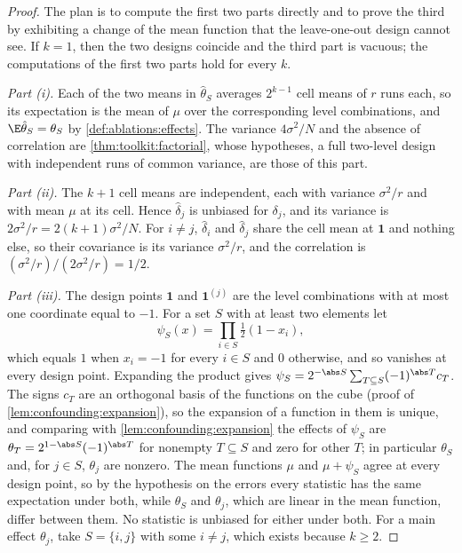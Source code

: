 \begin{refsection}
\begin{proof}
The plan is to compute the first two parts directly and to prove the third by exhibiting a change of the mean function that the leave-one-out design cannot see. If $k=1$, then the two designs coincide and the third part is vacuous; the computations of the first two parts hold for every $k$.

\emph{Part (i).} Each of the two means in $\hat\theta_S$ averages $2^{k-1}$ cell means of $r$ runs each, so its expectation is the mean of $\mu$ over the corresponding level combinations, and $\E\hat\theta_S=\theta_S$ by \cref{def:ablations:effects}. The variance $4\sigma^2/N$ and the absence of correlation are \cref{thm:toolkit:factorial}, whose hypotheses, a full two-level design with independent runs of common variance, are those of this part.

\emph{Part (ii).} The $k+1$ cell means are independent, each with variance $\sigma^2/r$ and with mean $\mu$ at its cell. Hence $\hat\delta_j$ is unbiased for $\delta_j$, and its variance is $2\sigma^2/r=2(k+1)\sigma^2/N$. For $i\ne j$, $\hat\delta_i$ and $\hat\delta_j$ share the cell mean at $\mathbf 1$ and nothing else, so their covariance is its variance $\sigma^2/r$, and the correlation is $(\sigma^2/r)/(2\sigma^2/r)=1/2$.

\emph{Part (iii).} The design points $\mathbf 1$ and $\mathbf 1^{(j)}$ are the level combinations with at most one coordinate equal to $-1$. For a set $S$ with at least two elements let
\[
\psi_S(x)=\prod_{i\in S}\tfrac12(1-x_i),
\]
which equals $1$ when $x_i=-1$ for every $i\in S$ and $0$ otherwise, and so vanishes at every design point. Expanding the product gives $\psi_S=2^{-\abs S}\sum_{T\subseteq S}(-1)^{\abs T}c_T$. The signs $c_T$ are an orthogonal basis of the functions on the cube (proof of \cref{lem:confounding:expansion}), so the expansion of a function in them is unique, and comparing with \cref{lem:confounding:expansion} the effects of $\psi_S$ are $\theta_T=2^{1-\abs S}(-1)^{\abs T}$ for nonempty $T\subseteq S$ and zero for other $T$; in particular $\theta_S$ and, for $j\in S$, $\theta_j$ are nonzero. The mean functions $\mu$ and $\mu+\psi_S$ agree at every design point, so by the hypothesis on the errors every statistic has the same expectation under both, while $\theta_S$ and $\theta_j$, which are linear in the mean function, differ between them. No statistic is unbiased for either under both. For a main effect $\theta_j$, take $S=\{i,j\}$ with some $i\ne j$, which exists because $k\ge2$.


\end{proof}
\end{refsection}
